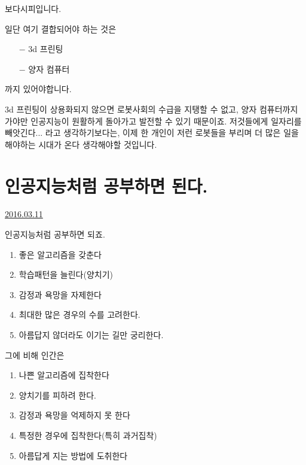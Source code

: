 보다시피입니다.
\vspace{5mm}

일단 여기 결합되어야 하는 것은
\begin{itemize}
    \item[$-$] 3d 프린팅
    \item[$-$] 양자 컴퓨터
\end{itemize}
까지 있어야합니다.
\vspace{5mm}

3d 프린팅이 상용화되지 않으면 로봇사회의 수급을 지탱할 수 없고,
양자 컴퓨터까지 가야만 인공지능이 원활하게 돌아가고 발전할 수 있기 때문이죠.
저것들에게 일자리를 빼앗긴다... 라고 생각하기보다는,
이제 한 개인이 저런 로봇들을 부리며 더 많은 일을 해야하는 시대가 온다 생각해야할 것입니다.
\vspace{5mm}






\section{인공지능처럼 공부하면 된다.}
\href{https://www.kockoc.com/Apoc/672926}{2016.03.11}

\vspace{5mm}

인공지능처럼 공부하면 되죠.
\vspace{5mm}
\begin{enumerate}
    \item 좋은 알고리즘을 갖춘다
    \item 학습패턴을 늘린다(양치기)
    \item 감정과 욕망을 자제한다
    \item 최대한 많은 경우의 수를 고려한다.
    \item 아름답지 않더라도 이기는 길만 궁리한다.
\end{enumerate}
\vspace{5mm}

그에 비해 인간은
\vspace{5mm}
\begin{enumerate}
    \item 나쁜 알고리즘에 집착한다
    \item 양치기를 피하려 한다.
    \item 감정과 욕망을 억제하지 못 한다
    \item 특정한 경우에 집착한다(특히 과거집착)
    \item 아름답게 지는 방법에 도취한다
\end{enumerate}
\vspace{5mm}

